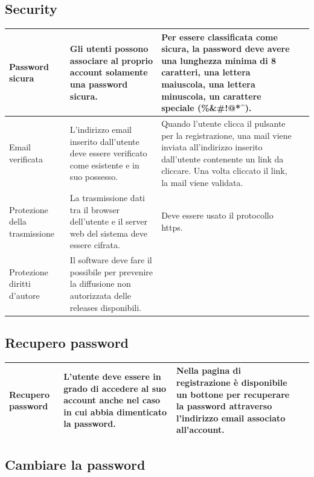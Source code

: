 \documentclass[a4paper,12pt]{article}
\begin{document}
\subsection*{Security}
{
    \centering
    \begin{tabularx}{\textwidth}{|l|>{\raggedright\arraybackslash}X|>{\raggedright\arraybackslash}X|>{\raggedright\arraybackslash}X|}
    \hline
    Password sicura & Gli utenti possono associare al proprio account solamente una password sicura. & Per essere classificata come sicura, la password deve avere una lunghezza minima di 8 caratteri, una lettera maiuscola, una lettera minuscola, un carattere speciale (\%\&\#!@*\textasciicircum). \\
    \hline
    Email verificata & L’indirizzo email inserito dall’utente deve essere verificato come esistente e in suo possesso. & Quando l’utente clicca il pulsante per la registrazione, una mail viene inviata all’indirizzo inserito dall’utente contenente un link da cliccare. Una volta cliccato il link, la mail viene validata. \\
    \hline
    Protezione della trasmissione & La trasmissione dati tra il browser dell’utente e il server web del sistema deve essere cifrata. & Deve essere usato il protocollo https. \\
    \hline
    Protezione diritti d'autore & Il software deve fare il possibile per prevenire la diffusione non autorizzata delle releases disponibili. & \\
    \hline
    \end{tabularx} \par
}
\subsection*{Recupero password}

{
    \centering
    \begin{tabularx}{\textwidth}{|l|>{\raggedright\arraybackslash}X|>{\raggedright\arraybackslash}X|>{\raggedright\arraybackslash}X|}
    \hline
    Recupero password & L’utente deve essere in grado di accedere al suo account anche nel caso in cui abbia dimenticato la password. & Nella pagina di registrazione è disponibile un bottone per recuperare la password attraverso l’indirizzo email associato all’account. \\
    \hline
    \end{tabularx} \par
}
\subsection*{Cambiare la password}
\end{document}
